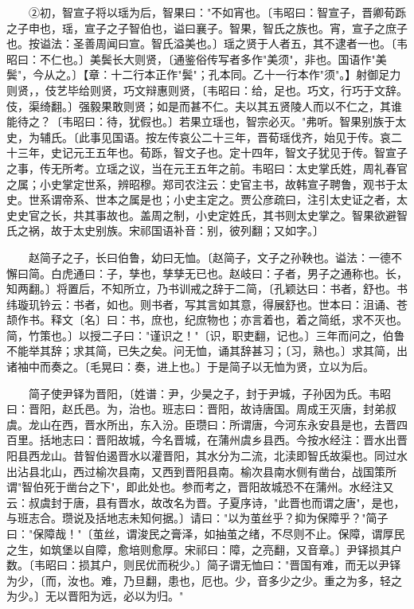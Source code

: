 　　②初，智宣子将以瑶为后，智果曰："不如宵也。〔韦昭曰：智宣子，晋卿荀跞之子申也，瑶，宣子之子智伯也，谥曰襄子。智果，智氏之族也。宵，宣子之庶子也。按谥法：圣善周闻曰宣。智氏溢美也。〕瑶之贤于人者五，其不逮者一也。〔韦昭曰：不仁也。〕美鬓长大则贤，〔通鉴俗传写者多作"美须"，非也。国语作"美鬓"，今从之。〕【章：十二行本正作"鬓"；孔本同。乙十一行本作"须"。】射御足力则贤，，伎艺毕给则贤，巧文辩惠则贤，〔韦昭曰：给，足也。巧文，行巧于文辞。伎，渠绮翻。〕强毅果敢则贤；如是而甚不仁。夫以其五贤陵人而以不仁之，其谁能待之？〔韦昭曰：待，犹假也。〕若果立瑶也，智宗必灭。"弗听。智果别族于太史，为辅氏。〔此事见国语。按左传哀公二十三年，晋荀瑶伐齐，始见于传。哀二十三年，史记元王五年也。荀跞，智文子也。定十四年，智文子犹见于传。智宣子之事，传无所考。立瑶之议，当在元王五年之前。韦昭曰：太史掌氏姓，周礼春官之属；小史掌定世系，辨昭穆。郑司农注云：史官主书，故韩宣子聘鲁，观书于太史。世系谓帝系、世本之属是也；小史主定之。贾公彦疏曰，注引太史证之者，太史史官之长，共其事故也。盖周之制，小史定姓氏，其书则太史掌之。智果欲避智氏之祸，故于太史别族。宋祁国语补音：别，彼列翻；又如字。〕

　　赵简子之子，长曰伯鲁，幼曰无恤。〔赵简子，文子之孙鞅也。谥法：一德不懈曰简。白虎通曰：子，孳也，孳孳无已也。赵岐曰：子者，男子之通称也。长，知两翻。〕将置后，不知所立，乃书训戒之辞于二简，〔孔颖达曰：书者，舒也。书纬璇玑钤云：书者，如也。则书者，写其言如其意，得展舒也。世本曰：沮诵、苍颉作书。释文〔名〕曰：书，庶也，纪庶物也；亦言着也，着之简纸，求不灭也。简，竹策也。〕以授二子曰："谨识之！"〔识，职吏翻，记也。〕三年而问之，伯鲁不能举其辞；求其简，已失之矣。问无恤，诵其辞甚习；〔习，熟也。〕求其简，出诸袖中而奏之。〔毛晃曰：奏，进上也。〕于是简子以无恤为贤，立以为后。

　　简子使尹铎为晋阳，〔姓谱：尹，少昊之子，封于尹城，子孙因为氏。韦昭曰：晋阳，赵氏邑。为，治也。班志曰：晋阳，故诗唐国。周成王灭唐，封弟叔虞。龙山在西，晋水所出，东入汾。臣瓒曰：所谓唐，今河东永安县是也，去晋四百里。括地志曰：晋阳故城，今名晋城，在蒲州虞乡县西。今按水经注：晋水出晋阳县西龙山。昔智伯遏晋水以灌晋阳，其水分为二流，北渎即智氏故渠也。同过水出沾县北山，西过榆次县南，又西到晋阳县南。榆次县南水侧有凿台，战国策所谓"智伯死于凿台之下"，即此处也。参而考之，晋阳故城恐不在蒲州。水经注又云：叔虞封于唐，县有晋水，故改名为晋。子夏序诗，"此晋也而谓之唐"，是也，与班志合。瓒说及括地志未知何据。〕请曰："以为茧丝乎？抑为保障乎？"简子曰："保障哉！"〔茧丝，谓浚民之膏泽，如抽茧之绪，不尽则不止。保障，谓厚民之生，如筑堡以自障，愈培则愈厚。宋祁曰：障，之亮翻，又音章。〕尹铎损其户数。〔韦昭曰：损其户，则民优而税少。〕简子谓无恤曰："晋国有难，而无以尹铎为少，〔而，汝也。难，乃旦翻，患也，厄也。少，音多少之少。重之为多，轻之为少。〕无以晋阳为远，必以为归。"

